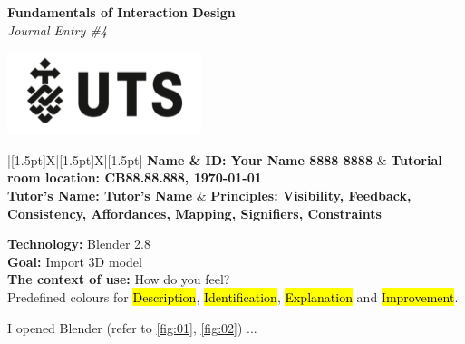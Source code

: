 \documentclass[12pt]{article}
\newcommand\ex[2][ex]{\sethlcolor{#1}\hl{#2}}
\newcommand\de[2][de]{\sethlcolor{#1}\hl{#2}}
\newcommand\id[2][id]{\sethlcolor{#1}\hl{#2}}
\newcommand\im[2][im]{\sethlcolor{#1}\hl{#2}}
\begin{document}
\setlength{\parindent}{0pt}

\begin{minipage}{.69\linewidth}
  \begin{flushleft}
    \vspace{2mm}
    {
    \fontsize{18}{1}\selectfont
    \textbf{Fundamentals of Interaction Design} 
    \\
    \fontsize{12}{1}\selectfont
    \textit{Journal Entry \#4}
    }
  \end{flushleft}
\end{minipage}
\hfill
\begin{minipage}{.29\linewidth}
  \begin{flushright}
    \includegraphics{uts.png}
    \label{fig:uts_logo}
  \end{flushright}
\end{minipage}

\vspace{6mm}

{\fontsize{10}{6mm}\selectfont
\begin{tabu}{|[1.5pt]X|[1.5pt]X|[1.5pt]}
\tabucline[1.5pt]{-}
\textbf{Name \& ID: Your Name 8888 8888}    & \textbf{Tutorial room location: CB88.88.888, \today} \\\tabucline[1.5pt]{-}
\textbf{Tutor’s Name: Tutor’s Name} & \textbf{Principles:
Visibility, Feedback, Consistency, Affordances, Mapping, Signifiers, Constraints} \\
\tabucline[1.5pt]{-}
\end{tabu}
}

\setlength{\parskip}{1em}
\renewcommand{\baselinestretch}{1.5}

\fontsize{11}{2mm}\selectfont
\noindent\textbf{Technology:} Blender 2.8 \\
\textbf{Goal:} Import 3D model \\
\textbf{The context of use:} How do you feel? \\
Predefined colours for \de{Description}, \id{Identification}, \ex{Explanation} and \im{Improvement}.

I opened Blender (refer to \ref{fig:01}, \ref{fig:02}) ...
\end{document}

